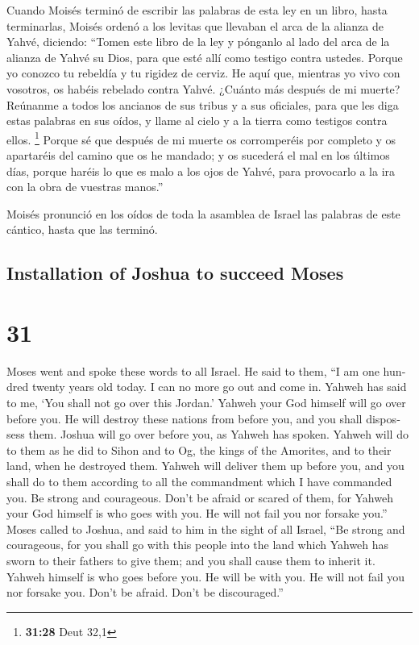 \begin{paracol}{2}
 Cuando Moisés terminó de escribir las palabras de esta
ley en un libro, hasta terminarlas,  Moisés ordenó a los
levitas que llevaban el arca de la alianza de Yahvé, diciendo:
 ``Tomen este libro de la ley y pónganlo al lado del arca
de la alianza de Yahvé su Dios, para que esté allí como testigo contra
ustedes.  Porque yo conozco tu rebeldía y tu rigidez de
cerviz. He aquí que, mientras yo vivo con vosotros, os habéis rebelado
contra Yahvé. ¿Cuánto más después de mi muerte?  Reúnanme
a todos los ancianos de sus tribus y a sus oficiales, para que les diga
estas palabras en sus oídos, y llame al cielo y a la tierra como
testigos contra ellos. \footnote{\textbf{31:28} Deut 32,1}
 Porque sé que después de mi muerte os corromperéis por
completo y os apartaréis del camino que os he mandado; y os sucederá el
mal en los últimos días, porque haréis lo que es malo a los ojos de
Yahvé, para provocarlo a la ira con la obra de vuestras manos.''

 Moisés pronunció en los oídos de toda la asamblea de
Israel las palabras de este cántico, hasta que las terminó.

\switchcolumn
\begin{otherlanguage}{english}

\hypertarget{installation-of-joshua-to-succeed-moses}{%
\subsection{Installation of Joshua to succeed
Moses}\label{installation-of-joshua-to-succeed-moses}}

\hypertarget{section-61}{%
\section{31}\label{section-61}}

 Moses went and spoke these words to all Israel.
 He said to them, ``I am one hundred twenty years old
today. I can no more go out and come in. Yahweh has said to me, `You
shall not go over this Jordan.'  Yahweh your God himself
will go over before you. He will destroy these nations from before you,
and you shall dispossess them. Joshua will go over before you, as Yahweh
has spoken.  Yahweh will do to them as he did to Sihon and
to Og, the kings of the Amorites, and to their land, when he destroyed
them.  Yahweh will deliver them up before you, and you
shall do to them according to all the commandment which I have commanded
you.  Be strong and courageous. Don't be afraid or scared
of them, for Yahweh your God himself is who goes with you. He will not
fail you nor forsake you.''  Moses called to Joshua, and
said to him in the sight of all Israel, ``Be strong and courageous, for
you shall go with this people into the land which Yahweh has sworn to
their fathers to give them; and you shall cause them to inherit it.
 Yahweh himself is who goes before you. He will be with
you. He will not fail you nor forsake you. Don't be afraid. Don't be
discouraged.''


\end{otherlanguage}
\end{paracol}
